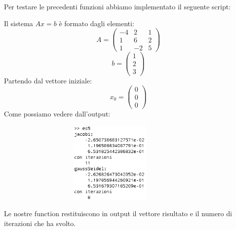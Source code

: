 \begin{flushleft}
Per testare le precedenti funzioni abbiamo implementato il seguente script:

Il sistema $Ax=b$ è formato dagli elementi:
\[
A = \left(\begin{array}{ccc} -4 & 2 & 1\\ 1 & 6 & 2\\ 1 & -2 & 5 \end{array}\right)
\]
\[
b = \left(\begin{array}{c} 1\\ 2\\ 3 \end{array}\right)
\]
Partendo dal vettore iniziale:
\[
x_0 = \left(\begin{array}{c} 0\\ 0\\ 0 \end{array}\right)
\]
Come possiamo vedere dall'output:
\begin{figure}[H]
\includegraphics[left, width=350px, height=150px]{cap_5/es5/es55.png}
\end{figure}
Le nostre function restituiscono in output il vettore risultato e il numero di iterazioni che ha svolto.
\end{flushleft}
